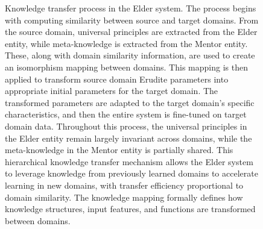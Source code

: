 \begin{figure}[t]
\caption{Knowledge transfer process in the Elder system. The process begins with computing similarity between source and target domains. From the source domain, universal principles are extracted from the Elder entity, while meta-knowledge is extracted from the Mentor entity. These, along with domain similarity information, are used to create an isomorphism mapping between domains. This mapping is then applied to transform source domain Erudite parameters into appropriate initial parameters for the target domain. The transformed parameters are adapted to the target domain's specific characteristics, and then the entire system is fine-tuned on target domain data. Throughout this process, the universal principles in the Elder entity remain largely invariant across domains, while the meta-knowledge in the Mentor entity is partially shared. This hierarchical knowledge transfer mechanism allows the Elder system to leverage knowledge from previously learned domains to accelerate learning in new domains, with transfer efficiency proportional to domain similarity. The knowledge mapping formally defines how knowledge structures, input features, and functions are transformed between domains.}
\label{fig:knowledge_transfer}
\end{figure}